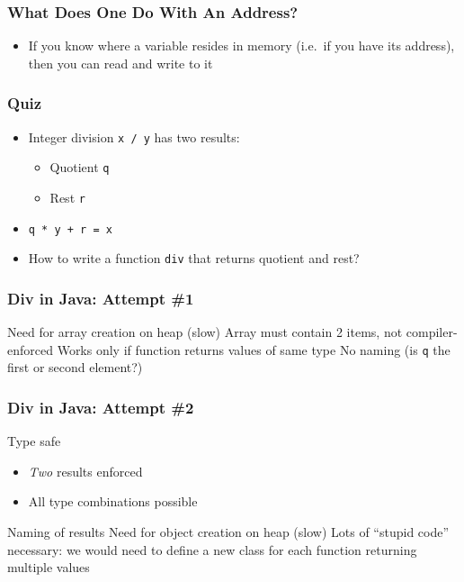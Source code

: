 \documentclass{../ucll-slides}
\begin{document}
\begin{frame}
  \frametitle{What Does One Do With An Address?}
  \begin{itemize}
  \item If you know where a variable resides in memory
        (i.e.\ if you have its address), then you can read and write to it
  \end{itemize}
  \vskip1cm
\end{frame}

\begin{frame}
  \frametitle{Quiz}
  \begin{itemize}
    \item Integer division {\tt x / y} has two results:
          \begin{itemize}
            \item Quotient {\tt q}
            \item Rest {\tt r}
          \end{itemize}
    \item {\tt q * y + r = x}
    \item How to write a function {\tt div} that returns quotient and rest?
  \end{itemize}
\end{frame}

\begin{frame}
  \frametitle{Div in Java: Attempt \#1}
  \vskip5mm
  \begin{procontralist}
     Need for array creation on heap (slow)
     Array must contain 2 items, not compiler-enforced
     Works only if function returns values of same type
     No naming (is {\tt q} the first or second element?)
  \end{procontralist}
\end{frame}

\begin{frame}
  \frametitle{Div in Java: Attempt \#2}
  \begin{procontralist}
     Type safe
             \begin{itemize}
               \item \emph{Two} results enforced
               \item All type combinations possible
             \end{itemize}
     Naming of results
     Need for object creation on heap (slow)
     Lots of ``stupid code'' necessary: we would need to define a new class for each function returning multiple values
  \end{procontralist}
\end{frame}
\end{document}
